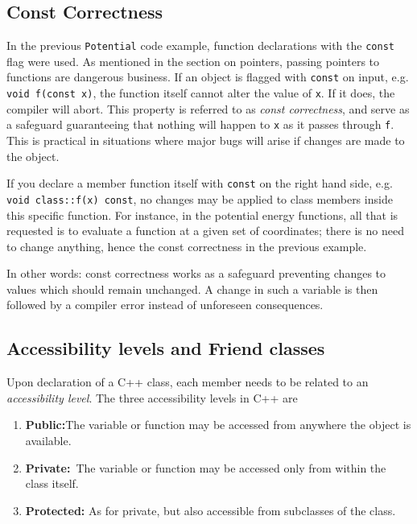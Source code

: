 \subsection{Const Correctness}

In the previous \verb+Potential+ code example, function declarations with the \verb+const+ flag were used. As mentioned in the section on pointers, passing pointers to functions are dangerous business. If an object is flagged with \verb+const+ on input, e.g. \verb+void f(const x)+, the function itself cannot alter the value of \verb+x+. If it does, the compiler will abort. This property is referred to as \textit{const correctness}, and serve as a safeguard guaranteeing that nothing will happen to \verb+x+ as it passes through \verb+f+. This is practical in situations where major bugs will arise if changes are made to the object.

If you declare a member function itself with \verb+const+ on the right hand side, e.g. \verb+void class::f(x) const+, no changes may be applied to class members inside this specific function. For instance, in the potential energy functions, all that is requested is to evaluate a function at a given set of coordinates; there is no need to change anything, hence the const correctness in the previous example. 

In other words: const correctness works as a safeguard preventing changes to values which should remain unchanged. A change in such a variable is then followed by a compiler error instead of unforeseen consequences.

\subsection{Accessibility levels and Friend classes}

Upon declaration of a C++ class, each member needs to be related to an \textit{accessibility level}. The three accessibility levels in C++ are 

\begin{enumerate}[label=\textbf{(\roman{*})}, ref=(\roman{*}), align=left]
 \item \textbf{Public:}\qquad The variable or function may be accessed from anywhere the object is available.
 \item \textbf{Private:}\quad\, The variable or function may be accessed only from within the class itself. 
 \item \textbf{Protected:} As for private, but also accessible from subclasses of the class.
 \label{enum:accessibilityLevels}
 \vspace{0.3cm}
\end{enumerate}

